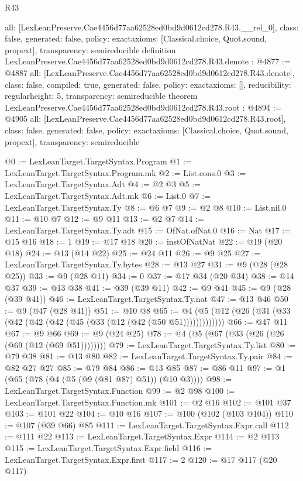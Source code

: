 \begin{lexlean}{R43}
\begin{coremodule}
{  all: [LexLeanPreserve.Cae4456d77aa62528ed0bd9d0612cd278.R43.__rel_0],
  class: false,
  generated: false,
  policy: exact{axioms: [Classical.choice, Quot.sound, propext]},
  transparency: semireducible
}
definition LexLeanPreserve.Cae4456d77aa62528ed0bd9d0612cd278.R43.denote : @4877 := @4887 {
  all: [LexLeanPreserve.Cae4456d77aa62528ed0bd9d0612cd278.R43.denote],
  class: false,
  compiled: true,
  generated: false,
  policy: exact{axioms: []},
  reducibility: regular{height: 5},
  transparency: semireducible
}
theorem LexLeanPreserve.Cae4456d77aa62528ed0bd9d0612cd278.R43.root : @4894 := @4905 {
  all: [LexLeanPreserve.Cae4456d77aa62528ed0bd9d0612cd278.R43.root],
  class: false,
  generated: false,
  policy: exact{axioms: [Classical.choice, Quot.sound, propext]},
  transparency: semireducible
}

@0 := LexLeanTarget.TargetSyntax.Program
@1 := LexLeanTarget.TargetSyntax.Program.mk
@2 := List.cons.{0}
@3 := LexLeanTarget.TargetSyntax.Adt
@4 := @2 @3
@5 := LexLeanTarget.TargetSyntax.Adt.mk
@6 := List.{0}
@7 := LexLeanTarget.TargetSyntax.Ty
@8 := @6 @7
@9 := @2 @8
@10 := List.nil.{0}
@11 := @10 @7
@12 := @9 @11
@13 := @2 @7
@14 := LexLeanTarget.TargetSyntax.Ty.adt
@15 := OfNat.ofNat.{0}
@16 := Nat
@17 := @15 @16
@18 := 1
@19 := @17 @18
@20 := instOfNatNat
@22 := @19 (@20 @18)
@24 := @13 (@14 @22)
@25 := @24 @11
@26 := @9 @25
@27 := LexLeanTarget.TargetSyntax.Ty.bytes
@28 := @13 @27
@31 := @9 (@28 (@28 @25))
@33 := @9 (@28 @11)
@34 := 0
@37 := @17 @34 (@20 @34)
@38 := @14 @37
@39 := @13 @38
@41 := @39 (@39 @11)
@42 := @9 @41
@45 := @9 (@28 (@39 @41))
@46 := LexLeanTarget.TargetSyntax.Ty.nat
@47 := @13 @46
@50 := @9 (@47 (@28 @41))
@51 := @10 @8
@65 := @4 (@5 (@12 (@26 (@31 (@33 (@42 (@42 (@42 (@45 (@33 (@12 (@42 (@50 @51)))))))))))))
@66 := @47 @11
@67 := @9 @66
@69 := @9 (@24 @25)
@78 := @4 (@5 (@67 (@33 (@26 (@26 (@69 (@12 (@69 @51))))))))
@79 := LexLeanTarget.TargetSyntax.Ty.list
@80 := @79 @38
@81 := @13 @80
@82 := LexLeanTarget.TargetSyntax.Ty.pair
@84 := @82 @27 @27
@85 := @79 @84
@86 := @13 @85
@87 := @86 @11
@97 := @1 (@65 (@78 (@4 (@5 (@9 (@81 @87) @51)) (@10 @3))))
@98 := LexLeanTarget.TargetSyntax.Function
@99 := @2 @98
@100 := LexLeanTarget.TargetSyntax.Function.mk
@101 := @2 @16
@102 := @101 @37
@103 := @101 @22
@104 := @10 @16
@107 := @100 (@102 (@103 @104))
@110 := @107 (@39 @66) @85
@111 := LexLeanTarget.TargetSyntax.Expr.call
@112 := @111 @22
@113 := LexLeanTarget.TargetSyntax.Expr
@114 := @2 @113
@115 := LexLeanTarget.TargetSyntax.Expr.field
@116 := LexLeanTarget.TargetSyntax.Expr.first
@117 := 2
@120 := @17 @117 (@20 @117)

\end{coremodule}
\end{lexlean}
